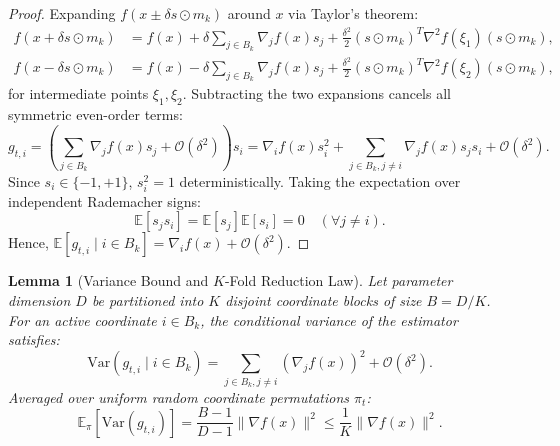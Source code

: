 \documentclass[11pt,a4paper]{article}
\newtheorem{lemma}[theorem]{Lemma}
\begin{document}
\begin{proof}
Expanding $f(x \pm \delta s \odot m_k)$ around $x$ via Taylor's theorem:
\begin{align*}
f(x + \delta s \odot m_k) &= f(x) + \delta \sum_{j \in B_k} \nabla_j f(x) s_j + \frac{\delta^2}{2} (s \odot m_k)^T \nabla^2 f(\xi_1) (s \odot m_k), \\
f(x - \delta s \odot m_k) &= f(x) - \delta \sum_{j \in B_k} \nabla_j f(x) s_j + \frac{\delta^2}{2} (s \odot m_k)^T \nabla^2 f(\xi_2) (s \odot m_k),
\end{align*}
for intermediate points $\xi_1, \xi_2$. Subtracting the two expansions cancels all symmetric even-order terms:
\begin{equation*}
g_{t,i} = \left( \sum_{j \in B_k} \nabla_j f(x) s_j + \mathcal{O}(\delta^2) \right) s_i = \nabla_i f(x) s_i^2 + \sum_{j \in B_k, j \neq i} \nabla_j f(x) s_j s_i + \mathcal{O}(\delta^2).
\end{equation*}
Since $s_i \in \{-1, +1\}$, $s_i^2 = 1$ deterministically. Taking the expectation over independent Rademacher signs:
\begin{equation*}
\mathbb{E}[s_j s_i] = \mathbb{E}[s_j] \mathbb{E}[s_i] = 0 \quad (\forall j \neq i).
\end{equation*}
Hence, $\mathbb{E}[g_{t,i} \mid i \in B_k] = \nabla_i f(x) + \mathcal{O}(\delta^2)$.
\end{proof}

\begin{lemma}[Variance Bound and $K$-Fold Reduction Law]
\label{lem:variance}
Let parameter dimension $D$ be partitioned into $K$ disjoint coordinate blocks of size $B = D/K$. For an active coordinate $i \in B_k$, the conditional variance of the estimator satisfies:
\begin{equation}
    \text{Var}(g_{t,i} \mid i \in B_k) = \sum_{j \in B_k, j \neq i} (\nabla_j f(x))^2 + \mathcal{O}(\delta^2).
\end{equation}
Averaged over uniform random coordinate permutations $\pi_t$:
\begin{equation}
    \mathbb{E}_{\pi} \left[ \text{Var}(g_{t,i}) \right] = \frac{B - 1}{D - 1} \|\nabla f(x)\|^2 \leq \frac{1}{K} \|\nabla f(x)\|^2.
\end{equation}
\end{lemma}
\end{document}
